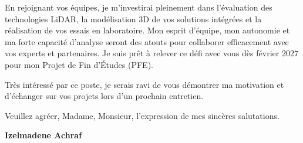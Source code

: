 \documentclass[10pt,a4paper]{altacv}
\begin{document}
\vspace{0.4cm}

En rejoignant vos équipes, je m'investirai pleinement dans l'évaluation des technologies LiDAR, la modélisation 3D de vos solutions intégrées et la réalisation de vos essais en laboratoire. Mon esprit d'équipe, mon autonomie et ma forte capacité d'analyse seront des atouts pour collaborer efficacement avec vos experts et partenaires. Je suis prêt à relever ce défi avec vous dès février 2027 pour mon Projet de Fin d'Études (PFE).

\vspace{0.4cm}

Très intéressé par ce poste, je serais ravi de vous démontrer ma motivation et d'échanger sur vos projets lors d'un prochain entretien.

\vspace{0.5cm}

Veuillez agréer, Madame, Monsieur, l'expression de mes sincères salutations.

\vfill

\begin{flushright}
  \Large\color{emphasis}\textbf{Izelmadene Achraf}
\end{flushright}
\end{document}
